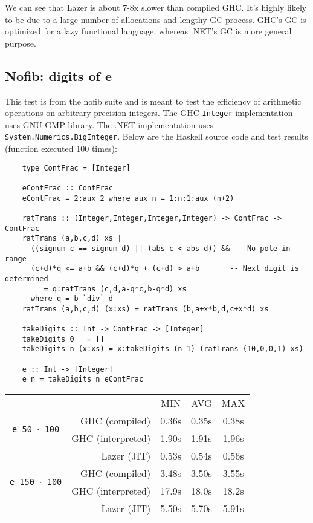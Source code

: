 \documentclass[en]{pracamgr}
\begin{document}
We can see that Lazer is about 7-8x slower than compiled GHC.
It's highly likely to be due to a large number of allocations
and lengthy GC process. GHC's GC is optimized for a lazy
functional language, whereas .NET's GC is more general purpose.

\subsection{Nofib: digits of e}

This test is from the nofib suite and is meant to test
the efficiency of arithmetic operations 
on arbitrary precision integers.
The GHC \texttt{Integer} implementation uses GNU GMP
library. The .NET implementation uses \texttt{System.Numerics.BigInteger}.
Below are the Haskell source code and test results (function executed 100 times):

\begin{verbatim}
    type ContFrac = [Integer]

    eContFrac :: ContFrac
    eContFrac = 2:aux 2 where aux n = 1:n:1:aux (n+2)
    
    ratTrans :: (Integer,Integer,Integer,Integer) -> ContFrac -> ContFrac
    ratTrans (a,b,c,d) xs |
      ((signum c == signum d) || (abs c < abs d)) && -- No pole in range
      (c+d)*q <= a+b && (c+d)*q + (c+d) > a+b       -- Next digit is determined
         = q:ratTrans (c,d,a-q*c,b-q*d) xs
      where q = b `div` d
    ratTrans (a,b,c,d) (x:xs) = ratTrans (b,a+x*b,d,c+x*d) xs
    
    takeDigits :: Int -> ContFrac -> [Integer]
    takeDigits 0 _ = []
    takeDigits n (x:xs) = x:takeDigits (n-1) (ratTrans (10,0,0,1) xs)
    
    e :: Int -> [Integer]
    e n = takeDigits n eContFrac
\end{verbatim}

\begin{center}
\begin{tabular}{c r c c c}
    & & MIN & AVG & MAX \\
    \cline{3-5}

    \multirow{2}{*}{\texttt{e 50 $\cdot$ 100}}
    & GHC (compiled)& 0.36s & 0.35s & 0.38s \\
    & GHC (interpreted)& 1.90s & 1.91s & 1.96s \\
    & Lazer (JIT)& 0.53s & 0.54s & 0.56s \\
    \cline{2-5}

    \multirow{2}{*}{\texttt{e 150 $\cdot$ 100}}
    & GHC (compiled)& 3.48s & 3.50s & 3.55s \\
    & GHC (interpreted)& 17.9s & 18.0s & 18.2s \\
    & Lazer (JIT)& 5.50s & 5.70s & 5.91s \\
\end{tabular}
\end{center}
\end{document}
